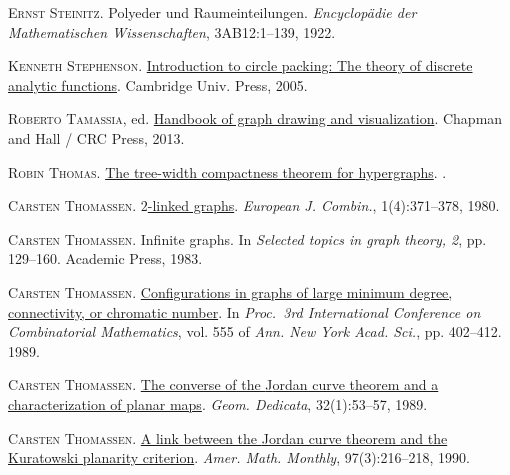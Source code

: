 \documentclass[a4paper,11pt]{article}
\theoremstyle{plain}
\theoremstyle{definition}
\begin{document}
\textsc{Ernst Steinitz}.
\newblock Polyeder und {R}aumeinteilungen.
\newblock \emph{Encyclop{\"a}die der Mathematischen Wissenschaften},
  3AB12:1--139, 1922.

\textsc{Kenneth Stephenson}.
\newblock
  \href{https://www.cambridge.org/au/academic/subjects/mathematics/geometry-and-topology/introduction-circle-packing-theory-discrete-analytic-functions?format=HB&isbn=9780521823562}{Introduction
  to circle packing: {T}he theory of discrete analytic functions}.
\newblock Cambridge Univ. Press, 2005.

\textsc{Roberto Tamassia}, ed.
\newblock \href{https://doi.org/10.1201/b15385}{Handbook of graph drawing and
  visualization}.
\newblock Chapman and Hall / CRC Press, 2013.

\textsc{Robin Thomas}.
\newblock \href{https://people.math.gatech.edu/~thomas/PAP/twcpt.pdf}{The
  tree-width compactness theorem for hypergraphs}.
.

\textsc{Carsten Thomassen}.
\newblock \href{https://doi.org/10.1016/S0195-6698(80)80039-4}{{$2$}-linked
  graphs}.
\newblock \emph{European J. Combin.}, 1(4):371--378, 1980.

\textsc{Carsten Thomassen}.
\newblock Infinite graphs.
\newblock In \emph{Selected topics in graph theory, 2}, pp. 129--160. Academic
  Press, 1983.

\textsc{Carsten Thomassen}.
\newblock
  \href{https://doi.org/10.1111/j.1749-6632.1989.tb22479.x}{Configurations in
  graphs of large minimum degree, connectivity, or chromatic number}.
\newblock In \emph{{P}roc.\ 3rd {I}nternational {C}onference on Combinatorial
  {M}athematics}, vol. 555 of \emph{Ann. New York Acad. Sci.}, pp. 402--412.
  1989{}.

\textsc{Carsten Thomassen}.
\newblock \href{https://doi.org/10.1007/BF00181436}{The converse of the
  {J}ordan curve theorem and a characterization of planar maps}.
\newblock \emph{Geom. Dedicata}, 32(1):53--57, 1989{}.

\textsc{Carsten Thomassen}.
\newblock \href{https://doi.org/10.2307/2324687}{A link between the {J}ordan
  curve theorem and the {K}uratowski planarity criterion}.
\newblock \emph{Amer. Math. Monthly}, 97(3):216--218, 1990.
\end{document}
